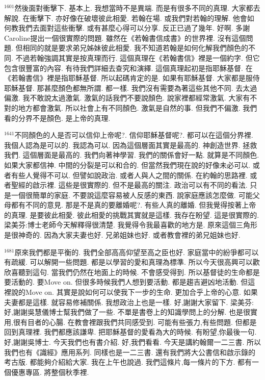 \documentclass{book}
\begin{document}
$^{1601}$然後面對衝擊下.
基本上.
我想當時不是異端.
而是有很多不同的真理.
大家都去解說.
在衝擊下.
亦好像在破壞彼此相愛.
若翰在場.
或我們對若翰的理解.
他會如何教我們去面對這些衝擊.
或有甚麼心得可以分享.
反正已過了幾年.
好啊.
多謝Caroline提出一個很實際的問題.
雖然在《若翰書信成書》的世界裡.
沒有這個問題.
但相同的就是要求弟兄姊妹彼此相愛.
我不知道若翰是如何化解我們顏色的不同.
不過若翰強調其實是按真理而行.
這個真理在《若翰書信》裡是一個約字.
但它包含很豐富的內容.
有待我們詳細去查究和演繹.
這個真理起初是指耶穌基督.
在《若翰書信》裡是指耶穌基督.
所以起碼肯定的是.
如果有耶穌基督.
大家都是服侍耶穌基督.
那甚麼顏色都無所謂.
都一樣.
我們沒有需要為著這些其他不同.
去太過偏激.
我不敢說太過激氣.
激氣的話我們不要說顏色.
說家裡都經常激氣.
大家有不對的地方都會激氣.
所以社會上有不同顏色.
激氣是自然的事.
但我們不偏激.
我們看的分界不是顏色.
是上帝的真理.

$^{1641}$不同顏色的人是否可以信仰上帝呢?.
信仰耶穌基督呢?.
都可以在這個分界裡.
我個人認為是可以的.
我認為可以.
因為這個層面其實是最高的.
神創造世界.
拯救我們.
這個層面是最高的.
我們向著神學習.
我們的關係會好一點.
就算是不同顏色.
如果大家都信神.
中間的分裂是可以和合的.
但當然我們現在說的好像未必可以.
或者有些人覺得不可以.
但譬如說政治.
或者人與人之間的關係.
在約翰的思路裡.
或者聖經的啟示裡.
這些是很實際的.
但不是最高的關注.
政治可以有不同的看法.
只是一個很簡單的家庭.
不要說這麼容易被人反感的東西.
說家庭應該怎麼做.
可能父母都有不同的意見.
那是不是真的要離婚呢?.
有些人真的離婚.
但我覺得按著上帝的真理.
是要彼此相愛.
彼此相愛的挑戰其實就是這樣.
我存在盼望.
這是很實際的.
梁美芬:博士老師今天解釋得很清楚.
我覺得令我最喜歡的地方是.
原來這個三角形是很神奇的.
因為大家夫妻也好.
兄弟姐妹也好.
或者教會裡的弟兄姐妹也好.

$^{1681}$原來我們都是平衡的.
我們全部高高仰望至高之臣也好.
家庭當中的紛爭都可以有疏緩.
可以解開一些問題.
都是以學習的愛和真理為標準.
所以今天很高興可以歡欣喜聽到這句.
當我們仍然在地面上的時候.
不會感受得到.
所以基督徒的生命都是要活動的.
要Move on.
但很多時候我們人想到要活動.
都是趨吉避凶地活動.
但這裡說的Move on.
其實是說如何可以使我下一步的生命.
更加合乎上帝的心意.
如果夫妻都是這樣.
就容易修補關係.
我想政治上也是一樣.
好,謝謝大家留下.
梁美芬:好,謝謝吳慧儀博士幫我們做了一些.
不單是書卷上的知識學問上的分解.
也是很實用,很有目者的心腸.
在教會裡跟我們共同感受到.
可能有些張力,有些問題.
但都是回到真理裡.
我們都應該謙卑.
把耶穌基督的愛看為大的時候.
有盼望,你最後一句.
好,謝謝吳博士.
今天我們也有書介紹.
好,我們看看.
今天是講約翰爾一二三書.
所以我們也有《識經》應用系列.
同樣也是一二三書.
還有我們將大公書信和啟示錄的考古版.
都能夠介紹給大家.
我在上午也說過.
我們這條片,每一條片的下方.
都有一個優惠專區.
將整個秋季裡.
\end{document}
